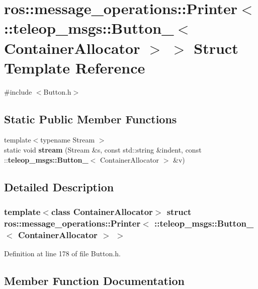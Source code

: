 \section{ros::message\_\-operations::Printer$<$ ::teleop\_\-msgs::Button\_\-$<$ ContainerAllocator $>$ $>$ Struct Template Reference}
\label{structros_1_1message__operations_1_1Printer_3_01_1_1teleop__msgs_1_1Button___3_01ContainerAllocator_01_4_01_4}


{\ttfamily \#include $<$Button.h$>$}

\subsection*{Static Public Member Functions}
\begin{DoxyCompactItemize}
\item 
{\footnotesize template$<$typename Stream $>$ }\\static void {\bf stream} (Stream \&s, const std::string \&indent, const ::{\bf teleop\_\-msgs::Button\_\-}$<$ ContainerAllocator $>$ \&v)
\end{DoxyCompactItemize}


\subsection{Detailed Description}
\subsubsection*{template$<$class ContainerAllocator$>$ struct ros::message\_\-operations::Printer$<$ ::teleop\_\-msgs::Button\_\-$<$ ContainerAllocator $>$ $>$}



Definition at line 178 of file Button.h.



\subsection{Member Function Documentation}
